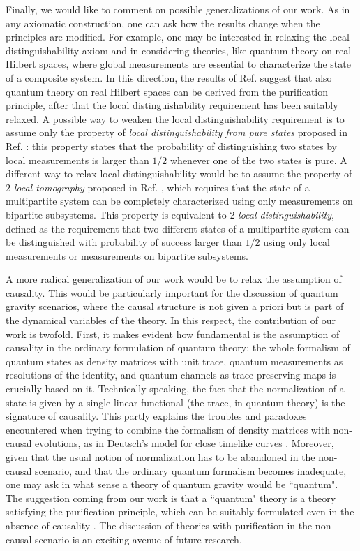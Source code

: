 \documentclass[12pt,aps,pra,showpacs,groupedaddress]{revtex4-1}
\begin{document}
Finally, we would like to comment on possible generalizations of our work.  As in any axiomatic
construction, one can ask how the results change when the principles are modified.  For example, one
may be interested in relaxing the local distinguishability axiom and in considering theories, like
quantum theory on real Hilbert spaces, where global measurements are essential to characterize the
state of a composite system.  In this direction, the results of Ref. \cite{purification} suggest
that also quantum theory on real Hilbert spaces can be derived from the purification principle,
after that the local distinguishability requirement has been suitably relaxed. A possible way to
weaken the local distinguishability requirement is to assume only the property of \emph{local
  distinguishability from pure states} proposed in Ref. \cite{purification}: this property states
that the probability of distinguishing two states by local measurements is larger than $1/2$
whenever one of the two states is pure.  A different way to relax local distinguishability would be
to assume the property of 2-\emph{local tomography} proposed in Ref. \cite{hw}, which requires that the
state of a multipartite system can be completely characterized using only measurements on bipartite
subsystems. This property is equivalent to 2-\emph{local distinguishability}, defined as the requirement that two different states of a multipartite system can be distinguished
with probability of success larger than $1/2$ using only local measurements or measurements on bipartite
subsystems.

A more radical generalization of our work would be to relax the assumption of causality.  This would
be particularly important for the discussion of quantum gravity scenarios, where the causal
structure is not given a priori but is part of the dynamical variables of the theory.  In this
respect, the contribution of our work is twofold.  First, it makes evident how fundamental is the
assumption of causality in the ordinary formulation of quantum theory: the whole formalism of
quantum states as density matrices with unit trace, quantum measurements as resolutions of the
identity, and quantum channels as trace-preserving maps is crucially based on it.  Technically
speaking, the fact that the normalization of a state is given by a single linear functional (the
trace, in quantum theory) is the signature of causality.  This partly explains the troubles and
paradoxes encountered when trying to combine the formalism of density matrices with non-causal
evolutions, as in Deutsch's model for close timelike curves \cite{deutsch,bennett}.  Moreover, given
that the usual notion of normalization has to be abandoned in the non-causal scenario, and that the
ordinary quantum formalism becomes inadequate, one may ask in what sense a theory of quantum gravity
would be ``quantum".  The suggestion coming from our work is that a ``quantum" theory is a theory
satisfying the purification principle, which can be suitably formulated even in the absence of
causality \cite{inprep}. The discussion of theories with purification in the non-causal scenario is
an exciting avenue of future research.   
\end{document}
